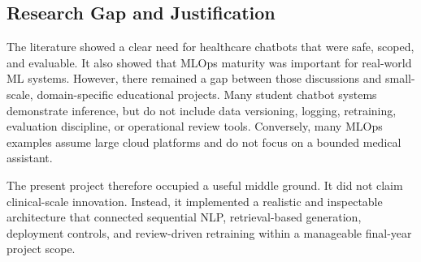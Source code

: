 \subsection{Research Gap and Justification}

The literature showed a clear need for healthcare chatbots that were safe, scoped, and evaluable. It also showed that MLOps maturity was important for real-world ML systems. However, there remained a gap between those discussions and small-scale, domain-specific educational projects. Many student chatbot systems demonstrate inference, but do not include data versioning, logging, retraining, evaluation discipline, or operational review tools. Conversely, many MLOps examples assume large cloud platforms and do not focus on a bounded medical assistant.

The present project therefore occupied a useful middle ground. It did not claim clinical-scale innovation. Instead, it implemented a realistic and inspectable architecture that connected sequential NLP, retrieval-based generation, deployment controls, and review-driven retraining within a manageable final-year project scope.
